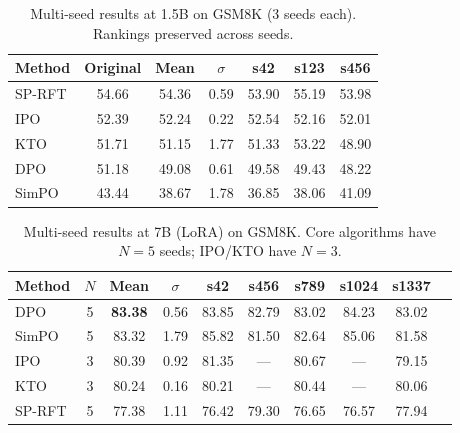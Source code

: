 \documentclass{article}
\newcommand{\sprft}{SP-RFT}
\begin{document}
\begin{table}[ht]
\centering
\caption{Multi-seed results at 1.5B on GSM8K (3 seeds each). Rankings preserved across seeds.}
\label{tab:seedfix}
\small
\begin{tabular}{@{}lcccccc@{}}
\toprule
\textbf{Method} & \textbf{Original} & \textbf{Mean} & \textbf{$\sigma$} & \textbf{s42} & \textbf{s123} & \textbf{s456} \\
\midrule
\sprft{} & 54.66 & 54.36 & 0.59 & 53.90 & 55.19 & 53.98 \\
IPO & 52.39 & 52.24 & 0.22 & 52.54 & 52.16 & 52.01 \\
KTO & 51.71 & 51.15 & 1.77 & 51.33 & 53.22 & 48.90 \\
DPO & 51.18 & 49.08 & 0.61 & 49.58 & 49.43 & 48.22 \\
SimPO & 43.44 & 38.67 & 1.78 & 36.85 & 38.06 & 41.09 \\
\bottomrule
\end{tabular}
\end{table}

\begin{table}[ht]
\centering
\caption{Multi-seed results at 7B (LoRA) on GSM8K. Core algorithms have $N{=}5$ seeds; IPO/KTO have $N{=}3$.}
\label{tab:seedfix_7b}
\small
\begin{tabular}{@{}lccccccccc@{}}
\toprule
\textbf{Method} & \textbf{$N$} & \textbf{Mean} & \textbf{$\sigma$} & \textbf{s42} & \textbf{s456} & \textbf{s789} & \textbf{s1024} & \textbf{s1337} \\
\midrule
DPO & 5 & \textbf{83.38} & 0.56 & 83.85 & 82.79 & 83.02 & 84.23 & 83.02 \\
SimPO & 5 & 83.32 & 1.79 & 85.82 & 81.50 & 82.64 & 85.06 & 81.58 \\
IPO & 3 & 80.39 & 0.92 & 81.35 & --- & 80.67 & --- & 79.15 \\
KTO & 3 & 80.24 & 0.16 & 80.21 & --- & 80.44 & --- & 80.06 \\
\sprft{} & 5 & 77.38 & 1.11 & 76.42 & 79.30 & 76.65 & 76.57 & 77.94 \\
\bottomrule
\end{tabular}
\end{table}
\end{document}
